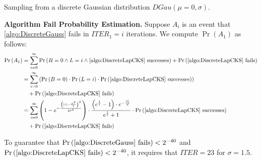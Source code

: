 \begin{algorithm}[tbh!]
    \centering
    \caption{Sampling from a discrete Gaussian distribution $ DGau \left(\mu=0,\sigma\right)$.}
    \label{algo:DiscreteGauss}
\end{algorithm}
\FloatBarrier

\textbf{Algorithm Fail Probability Estimation. }
Suppose $A_i$ is an event that \autoref{algo:DiscreteGauss} fails in $ITER_1=i$ iterations.
We compute $\Pr\left(A_1\right) $ as follows:
\begin{equation}
    \begin{split}
        \Pr\left(A_1\right) &=\sum_{i = 0}^{\infty}  \Pr\left( B= 0 \land L=i \land \autoref{algo:DiscreteLapCKS}  \text{ successes}\right) + \Pr\left(\autoref{algo:DiscreteLapCKS}  \text{ fails}\right) \\
        &= \sum_{i = 0}^{\infty}  \left(\Pr\left( B= 0 \right) \cdot \Pr\left( L=i \right)\cdot \Pr\left(  \autoref{algo:DiscreteLapCKS}  \text{ successes}\right)\right) \\
        & \quad + \Pr\left(\autoref{algo:DiscreteLapCKS}  \text{ fails}\right) \\
        &=\sum_{i = 0}^{\infty} \left(1-e^{-\frac{\left(\left\lvert i\right\rvert-\frac{\sigma^2}{t}\right)^2  }{2\sigma^2}}\right)  \cdot \frac{\left(e^{\frac{1}{t}}-1\right) \cdot  e^{-\frac{\left\lvert i\right\rvert }{d}}}{e^{\frac{1}{t}}+1} \cdot \Pr\left(\autoref{algo:DiscreteLapCKS} \text{ successes}\right) \\
        &\quad + \Pr\left(\autoref{algo:DiscreteLapCKS} \text{ fails}\right) \\
    \end{split}
\end{equation}

To guarantee that $\Pr\left( \autoref{algo:DiscreteGauss} \text{ fails} \right) <2^{-40}$ and $\Pr\left( \autoref{algo:DiscreteLapCKS}  \text{ fails} \right) <2^{-40}$, it requires that $ITER=23$ for $\sigma =1.5$.

